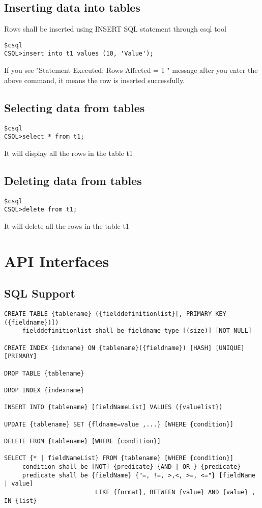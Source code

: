 \documentclass[12pt]{article}
\begin{document}
\subsection{Inserting data into tables}
\label{insertingdata}
Rows shall be inserted using INSERT SQL statement through csql tool
\begin{verbatim}
$csql
CSQL>insert into t1 values (10, 'Value');

\end{verbatim}
If you see "Statement Executed: Rows Affected = 1 " message after you enter the above command, it means the row is inserted successfully.

\subsection{Selecting data from tables}
\label{selectdata}

\begin{verbatim}
$csql
CSQL>select * from t1;
\end{verbatim}
It will display all the rows in the table t1


\subsection{Deleting data from tables}
\label{deletedata}

\begin{verbatim}
$csql
CSQL>delete from t1;
\end{verbatim}
It will delete all the rows in the table t1
\section{API Interfaces}

\subsection{SQL Support}
\label{SQL Syntax Support:}

\begin{verbatim}
CREATE TABLE {tablename} ({fielddefinitionlist}[, PRIMARY KEY ({fieldname})]) 
     fielddefinitionlist shall be fieldname type [(size)] [NOT NULL] 

CREATE INDEX {idxname} ON {tablename}({fieldname}) [HASH] [UNIQUE] [PRIMARY]

DROP TABLE {tablename} 

DROP INDEX {indexname} 

INSERT INTO {tablename} [fieldNameList] VALUES ({valuelist}) 

UPDATE {tablename} SET {fldname=value ,...} [WHERE {condition}] 

DELETE FROM {tablename} [WHERE {condition}] 

SELECT {* | fieldNameList} FROM {tablename} [WHERE {condition}] 
     condition shall be [NOT] {predicate} {AND | OR } {predicate} 
     predicate shall be {fieldName} {"=, !=, >,<, >=, <="} [fieldName | value] 
                         LIKE {format}, BETWEEN {value} AND {value} , IN {list} 
\end{verbatim}
\end{document}
